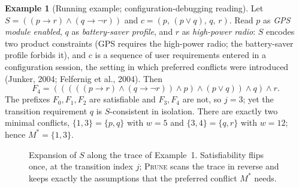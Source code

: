 \documentclass[11pt,reqno]{amsart}
\theoremstyle{plain}
\theoremstyle{definition}
\newtheorem{example}{Example}
\newcommand{\Mstar}{M^{*}}
\newcommand{\PRUNE}{\textsc{Prune}}
\begin{document}
\begin{example}[Running example; configuration-debugging reading]
Let $S=((p\rightarrow r)\wedge(q\rightarrow\neg r))$ and
$c=(p,\,(p\vee q),\,q,\,r)$. Read $p$ as \emph{GPS module enabled}, $q$ as
\emph{battery-saver profile}, and $r$ as \emph{high-power radio}: $S$ encodes two
product constraints (GPS requires the high-power radio; the battery-saver profile
forbids it), and $c$ is a sequence of user requirements entered in a configuration
session, the setting in which preferred conflicts were introduced (Junker, 2004;
Felfernig et al., 2004). Then
\begin{equation}
F_4=(((((p\rightarrow r)\wedge(q\rightarrow\neg r))\wedge p)\wedge(p\vee q))\wedge q)\wedge r.
\end{equation}
The prefixes $F_0,F_1,F_2$ are satisfiable and $F_3,F_4$ are not, so $j=3$; yet the
transition requirement $q$ is $S$-consistent in isolation. There are exactly two
minimal conflicts, $\{1,3\}=\{p,q\}$ with $w=5$ and $\{3,4\}=\{q,r\}$ with $w=12$;
hence $\Mstar=\{1,3\}$.
\end{example}

\begin{figure}[t]
\centering
{}
\caption{Expansion of $S$ along the trace of Example~1. Satisfiability flips once,
at the transition index $j$; \PRUNE{} scans the trace in reverse and keeps exactly
the assumptions that the preferred conflict $\Mstar$ needs.}
\label{fig:scan}
\end{figure}
\end{document}

